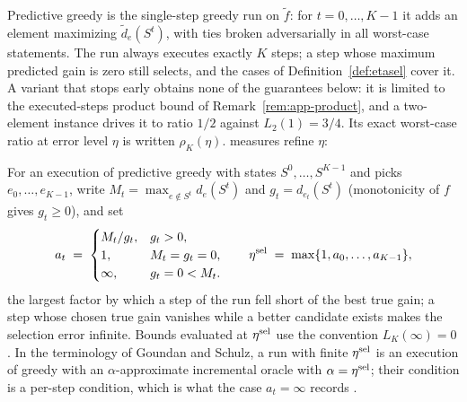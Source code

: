 Predictive greedy is the single-step greedy run on $\tilde f$: for
$t=0,\dots,K-1$ it adds an element maximizing $\tilde d_e(S^{t})$, with ties
broken adversarially in all worst-case statements.  The run always executes
exactly $K$ steps; a step whose maximum predicted gain is zero still
selects, and the cases of Definition~\ref{def:etasel} cover it.  A variant
that stops early obtains none of the guarantees below: it is limited to the
executed-steps product bound of Remark~\ref{rem:app-product}, and a
two-element instance drives it to ratio $1/2$ against $L_2(1)=3/4$.
Its exact worst-case ratio
at error level $\eta$ is written $\rho_K(\eta)$.
measures refine $\eta$:
\begin{definition}\label{def:etasel}
For an execution of predictive greedy with states
$S^{0},\dots,S^{K-1}$ and picks $e_{0},\dots,e_{K-1}$, write
$M_t=\max_{e\notin S^{t}} d_{e}(S^{t})$ and $g_t=d_{e_t}(S^{t})$
(monotonicity of $f$ gives $g_t\ge0$), and set
\[
  a_t\;=\;\begin{cases}
    M_t/g_t, & g_t>0,\\
    1, & M_t=g_t=0,\\
    \infty, & g_t=0<M_t .
  \end{cases}
  \qquad
  \eta^{\mathrm{sel}}\;=\;\max\{1,a_0,\dots,a_{K-1}\},
\]
the largest factor by which a step of the run fell short of the best true
gain; a step whose chosen true gain vanishes while a better candidate
exists makes the selection error infinite.  Bounds evaluated at
$\eta^{\mathrm{sel}}$ use the convention $L_K(\infty)=0$.  In the terminology of
Goundan and Schulz, a run with finite $\eta^{\mathrm{sel}}$ is an execution of greedy
with an $\alpha$-approximate incremental oracle with $\alpha=\eta^{\mathrm{sel}}$;
their condition is a per-step condition, which is what the case
$a_t=\infty$ records \citep{goundan2007revisiting}.
\end{definition}
